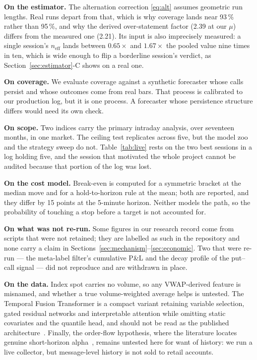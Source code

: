 \documentclass[conference]{IEEEtran}
\begin{document}
\textbf{On the estimator.} The alternation correction \eqref{eq:alt} assumes
geometric run lengths. Real runs depart from that, which is why coverage lands
near 93\,\% rather than 95\,\%, and why the derived over-statement factor (2.39
at our $\mu$) differs from the measured one (2.21). Its input is also
imprecisely measured: a single session's $n_{\text{eff}}$ lands between
$0.65\times$ and $1.67\times$ the pooled value nine times in ten, which is wide
enough to flip a borderline session's verdict, as
Section~\ref{sec:estimator}-C shows on a real one.

\textbf{On coverage.} We evaluate coverage against a synthetic forecaster whose
calls persist and whose outcomes come from real bars. That process is calibrated
to our production log, but it is one process. A forecaster whose persistence
structure differs would need its own check.

\textbf{On scope.} Two indices carry the primary intraday analysis, over
seventeen months, in one market. The ceiling test replicates across five, but
the model zoo and the strategy sweep do not. Table~\ref{tab:live} rests on the
two best sessions in a log holding five, and the session that motivated the
whole project cannot be audited because that portion of the log was lost.

\textbf{On the cost model.} Break-even is computed for a symmetric bracket at
the median move and for a hold-to-horizon rule at the mean; both are reported,
and they differ by 15 points at the 5-minute horizon. Neither models the path,
so the probability of touching a stop before a target is not accounted for.

\textbf{On what was not re-run.} Some figures in our research record come from
scripts that were not retained; they are labelled as such in the repository and
none carry a claim in Sections~\ref{sec:mechanism}--\ref{sec:economic}. Two that
were re-run --- the meta-label filter's cumulative P\&L and the decay profile of
the put--call signal --- did not reproduce and are withdrawn in place.

\textbf{On the data.} Index spot carries no volume, so any VWAP-derived feature
is misnamed, and whether a true volume-weighted average helps is untested. The
Temporal Fusion Transformer is a compact variant retaining variable selection,
gated residual networks and interpretable attention while omitting static
covariates and the quantile head, and should not be read as the published
architecture~\cite{lim2021}. Finally, the order-flow hypothesis, where the
literature locates genuine short-horizon alpha~\cite{kolm2023,zhang2019},
remains untested here for want of history: we run a live collector, but
message-level history is not sold to retail accounts.
\end{document}
